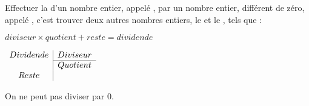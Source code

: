 
\begin{mydef}
	Effectuer la \hspace*{4cm} d’un nombre entier, appelé \hspace*{2cm}, par un nombre entier, différent de zéro, appelé \hspace*{2cm}, c’est trouver deux autres nombres entiers, le \hspace*{2cm} et le \hspace*{4cm}, tels que : 
	
	$diviseur \times quotient + reste = dividende$
	
\end{mydef}


\begin{center}
	$\begin{array}{c|c}
		Dividende & Diviseur \\
		\cline{2-2}
				& Quotient \\
		Reste & \\
	\end{array}$
\end{center}

\begin{mywarning}
	On ne peut pas diviser par 0.
\end{mywarning}


\vspace*{-1cm}	


